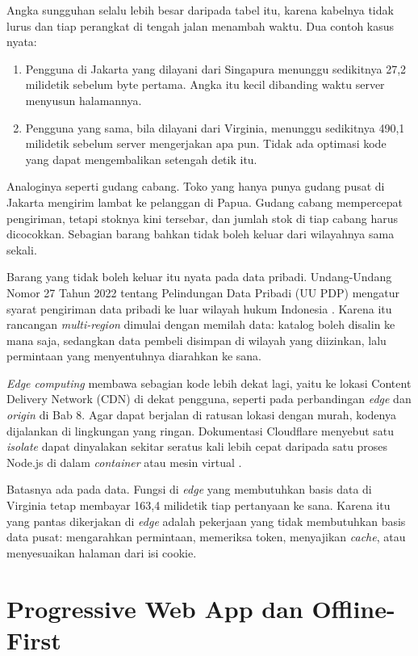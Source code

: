 Angka sungguhan selalu lebih besar daripada tabel itu, karena kabelnya tidak
lurus dan tiap perangkat di tengah jalan menambah waktu. Dua contoh kasus
nyata:
\begin{enumerate}
  \item Pengguna di Jakarta yang dilayani dari Singapura menunggu sedikitnya
        27,2 milidetik sebelum byte pertama. Angka itu kecil dibanding waktu
        server menyusun halamannya.
  \item Pengguna yang sama, bila dilayani dari Virginia, menunggu sedikitnya
        490,1 milidetik sebelum server mengerjakan apa pun. Tidak ada
        optimasi kode yang dapat mengembalikan setengah detik itu.
\end{enumerate}

Analoginya seperti gudang cabang. Toko yang hanya punya gudang pusat di
Jakarta mengirim lambat ke pelanggan di Papua. Gudang cabang mempercepat
pengiriman, tetapi stoknya kini tersebar, dan jumlah stok di tiap cabang harus
dicocokkan. Sebagian barang bahkan tidak boleh keluar dari wilayahnya sama
sekali.

Barang yang tidak boleh keluar itu nyata pada data pribadi. Undang-Undang
Nomor 27 Tahun 2022 tentang Pelindungan Data Pribadi (UU PDP) mengatur syarat
pengiriman data pribadi ke luar wilayah hukum Indonesia \cite{uu-pdp-2022}.
Karena itu rancangan \textit{multi-region} dimulai dengan memilah data:
katalog boleh disalin ke mana saja, sedangkan data pembeli disimpan di
wilayah yang diizinkan, lalu permintaan yang menyentuhnya diarahkan ke sana.

\textit{Edge computing} membawa sebagian kode lebih dekat lagi, yaitu ke
lokasi Content Delivery Network (CDN) di dekat pengguna, seperti pada
perbandingan \textit{edge} dan \textit{origin} di Bab 8. Agar dapat berjalan
di ratusan lokasi dengan murah, kodenya dijalankan di lingkungan yang ringan.
Dokumentasi Cloudflare menyebut satu \textit{isolate} dapat dinyalakan
sekitar seratus kali lebih cepat daripada satu proses Node.js di dalam
\textit{container} atau mesin virtual \cite{cloudflare-workers}.

Batasnya ada pada data. Fungsi di \textit{edge} yang membutuhkan basis data
di Virginia tetap membayar 163,4 milidetik tiap pertanyaan ke sana. Karena
itu yang pantas dikerjakan di \textit{edge} adalah pekerjaan yang tidak
membutuhkan basis data pusat: mengarahkan permintaan, memeriksa token,
menyajikan \textit{cache}, atau menyesuaikan halaman dari isi cookie.

\section{Progressive Web App dan Offline-First}


